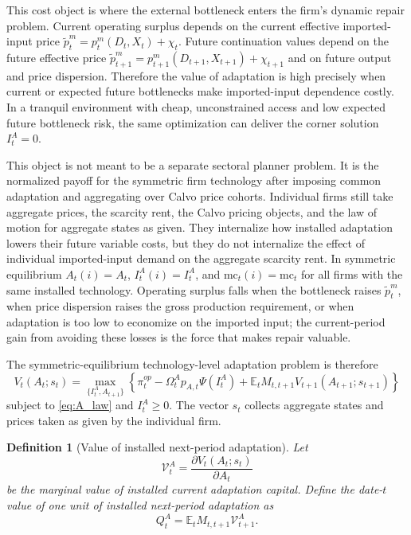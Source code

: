 ﻿\documentclass[12pt]{article}
\newtheorem{definition}{Definition}
\theoremstyle{remark}
\newcommand{\E}{\mathbb E}
\newcommand{\mc}{\mathrm{mc}}
\newcommand{\V}{\mathcal V}
\begin{document}
This cost object is where the external bottleneck enters the firm's dynamic repair problem. Current
operating surplus depends on the current effective imported-input price
$\tilde p_t^m=p_t^m(D_t,X_t)+\chi_t$. Future continuation values depend on the future effective
price $\tilde p_{t+1}^m=p_{t+1}^m(D_{t+1},X_{t+1})+\chi_{t+1}$ and on future output and price
dispersion. Therefore the value of adaptation is high precisely when current or expected future
bottlenecks make imported-input dependence costly. In a tranquil environment with cheap,
unconstrained access and low expected future bottleneck risk, the same optimization can deliver the
corner solution $I_t^A=0$.

This object is not meant to be a separate sectoral planner problem. It is the normalized payoff for
the symmetric firm technology after imposing common adaptation and aggregating over Calvo price
cohorts. Individual firms still take aggregate prices, the scarcity rent, the Calvo pricing
objects, and the law of motion for aggregate states as given. They internalize how installed
adaptation lowers their future variable costs, but they do not internalize the effect of individual
imported-input demand on the aggregate scarcity rent. In symmetric equilibrium
$A_t(i)=A_t$, $I_t^A(i)=I_t^A$, and $\mc_t(i)=\mc_t$ for all firms with the same installed
technology. Operating surplus falls when the bottleneck raises $\tilde p_t^m$, when price
dispersion raises the gross production requirement, or when adaptation is too low to economize on
the imported input; the current-period gain from avoiding these losses is the force that makes
repair valuable.

The symmetric-equilibrium technology-level adaptation problem is therefore
\begin{equation}
    V_t(A_t;s_t)
    =
    \max_{\{I_t^A,A_{t+1}\}}
    \left\{
        \pi_t^{op}
        -
        \Omega_t^A p_{A,t}\Psi(I_t^A)
        +
        \E_t M_{t,t+1}
        V_{t+1}(A_{t+1};s_{t+1})
    \right\}
    \label{eq:firm_value}
\end{equation}
subject to \eqref{eq:A_law} and $I_t^A\ge 0$. The vector $s_t$ collects aggregate states and prices
taken as given by the individual firm.

\begin{definition}[Value of installed next-period adaptation]\label{def:QA}
Let
\begin{equation}
    \V_t^A
    =
    \frac{\partial V_t(A_t;s_t)}{\partial A_t}
    \label{eq:VA_def}
\end{equation}
be the marginal value of installed current adaptation capital. Define the date-$t$ value of one
unit of installed next-period adaptation as
\begin{equation}
    Q_t^A
    =
    \E_t M_{t,t+1}\V_{t+1}^A.
    \label{eq:QA_def}
\end{equation}
\end{definition}
\end{document}
